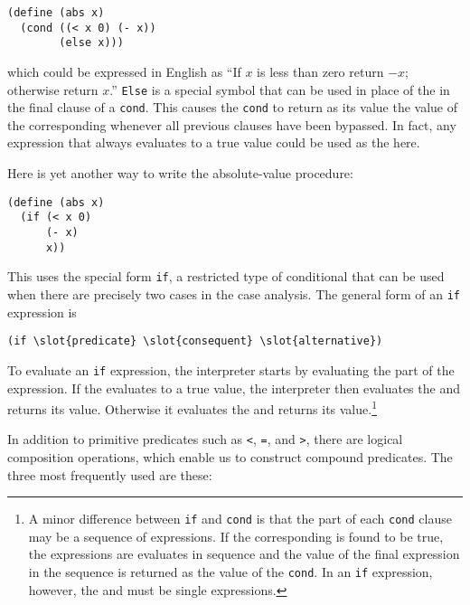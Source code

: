 \begin{verbatim}
(define (abs x)
  (cond ((< x 0) (- x))
        (else x)))
\end{verbatim}

\noindent which could be expressed in English as ``If $x$ is less than
zero return $-x$; otherwise return $x$.''  \texttt{Else} is a special
symbol that can be used in place of the  in the final clause
of a \texttt{cond}.  This causes the \texttt{cond} to return as its
value the value of the corresponding  whenever all previous
clauses have been bypassed.  In fact, any expression that always
evaluates to a true value could be used as the  here.

Here is yet another way to write the absolute-value procedure:

\begin{verbatim}
(define (abs x)
  (if (< x 0)
      (- x)
      x))
\end{verbatim}

This uses the special form \texttt{if}, a restricted type of conditional
that can be used when there are precisely two cases in the case
analysis.  The general form of an \texttt{if} expression is

\begin{verbatim}
(if \slot{predicate} \slot{consequent} \slot{alternative})
\end{verbatim}

To evaluate an \texttt{if} expression, the interpreter starts by
evaluating the  part of the expression.  If the
 evaluates to a true value, the interpreter then
evaluates the  and returns its value.  Otherwise it
evaluates the  and returns its value.\footnote{A
  minor difference between \texttt{if} and \texttt{cond} is that the
   part of each \texttt{cond} clause may be a sequence of
  expressions. If the corresponding  is found to be true, the
  expressions  are evaluates in sequence and the value of the
  final expression in the sequence is returned as the value of the
  \texttt{cond}. In an \texttt{if} expression, however, the
   and  must be single
  expressions.}

In addition to primitive predicates such as \texttt{<}, \texttt{=},
and \texttt{>}, there are logical composition operations, which enable
us to construct compound predicates.  The three most frequently used
are these:

